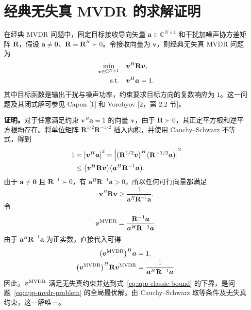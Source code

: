 \documentclass[11pt,a4paper]{ctexart}
\begin{document}
\section{经典无失真 MVDR 的求解证明}\label{app:classic}
在经典 MVDR 问题中，固定目标接收导向矢量 $\bm a\in\mathbb C^{N\times1}$ 和干扰加噪声协方差矩阵 $\mathbf R$，假设 $\bm a\ne\bm0$、$\mathbf R=\mathbf R^H\succ0$。令接收向量为 $\bm v$，则经典无失真 MVDR 问题为
\begin{align}\label{eq:app-mvdr-problem}
\min_{\bm v\in\mathbb C^{N\times1}}\quad
&\bm v^H\mathbf R\bm v,\\
\text{s.t.}\quad &\bm v^H\bm a=1.\notag
\end{align}
其中目标函数是输出干扰与噪声功率，约束要求目标方向的复数响应为 $1$。这一问题及其闭式解可参见 Capon [1] 和 Vorobyov [2，第 2.2 节]。

\noindent\textbf{证明。}对于任意满足约束 $\bm v^H\bm a=1$ 的向量 $\bm v$，由于 $\mathbf R\succ0$，其正定平方根和逆平方根均存在。将单位矩阵 $\mathbf R^{1/2}\mathbf R^{-1/2}$ 插入内积，并使用 Cauchy--Schwarz 不等式，得到
\begin{align}\label{eq:app-classic-cs}
1&=\left|\bm v^H\bm a\right|^2
=\left|\bigl(\mathbf R^{1/2}\bm v\bigr)^H
\bigl(\mathbf R^{-1/2}\bm a\bigr)\right|^2\notag\\
&\le\bigl(\bm v^H\mathbf R\bm v\bigr)
\bigl(\bm a^H\mathbf R^{-1}\bm a\bigr).
\end{align}
由于 $\bm a\ne\bm0$ 且 $\mathbf R^{-1}\succ0$，有 $\bm a^H\mathbf R^{-1}\bm a>0$，所以任何可行向量都满足
\begin{equation}\label{eq:app-classic-bound}
\bm v^H\mathbf R\bm v\ge
\frac{1}{\bm a^H\mathbf R^{-1}\bm a}.
\end{equation}
令
\begin{equation}\label{eq:app-classic-solution}
\bm v^{\rm MVDR}=
\frac{\mathbf R^{-1}\bm a}{\bm a^H\mathbf R^{-1}\bm a}.
\end{equation}
由于 $\bm a^H\mathbf R^{-1}\bm a$ 为正实数，直接代入可得
\begin{align}\label{eq:app-classic-check}
\bigl(\bm v^{\rm MVDR}\bigr)^H\bm a&=1,\\
\bigl(\bm v^{\rm MVDR}\bigr)^H\mathbf R\bm v^{\rm MVDR}
&=\frac{1}{\bm a^H\mathbf R^{-1}\bm a}.\notag
\end{align}
因此，$\bm v^{\rm MVDR}$ 满足无失真约束并达到式~\eqref{eq:app-classic-bound} 的下界，是问题~\eqref{eq:app-mvdr-problem} 的全局最优解。由 Cauchy--Schwarz 取等条件及无失真约束，这一解唯一。
\end{document}
